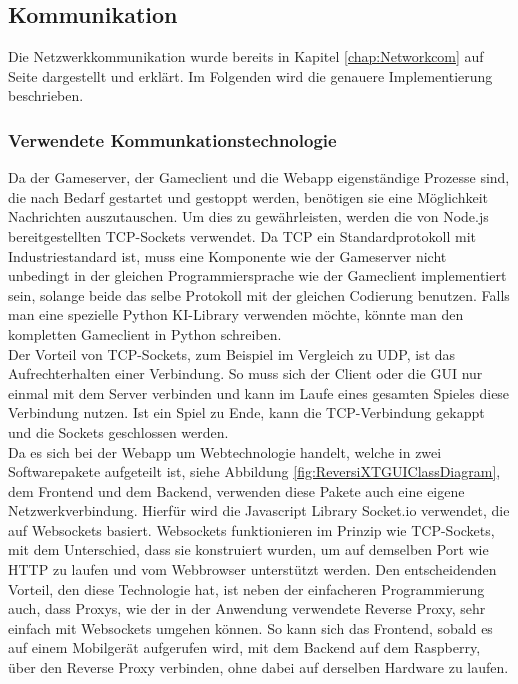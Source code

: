 \documentclass[12pt,a4paper,bibliography=totocnumbered,listof=totocnumbered]{article}
\begin{document}
\subsection{Kommunikation}
Die Netzwerkkommunikation wurde bereits in Kapitel \ref{chap:Networkcom} auf Seite \pageref{chap:Networkcom} dargestellt und erklärt.
Im Folgenden wird die genauere Implementierung beschrieben.

\subsubsection{Verwendete Kommunkationstechnologie}
Da der Gameserver, der Gameclient und die Webapp eigenständige Prozesse sind, die nach Bedarf gestartet und gestoppt werden, benötigen sie eine 
Möglichkeit Nachrichten auszutauschen. Um dies zu gewährleisten, werden die von Node.js bereitgestellten \ac{TCP}-Sockets verwendet. 
Da \ac{TCP} ein Standardprotokoll mit Industriestandard ist, muss eine Komponente wie der Gameserver nicht unbedingt in der gleichen Programmiersprache 
wie der Gameclient implementiert sein, solange beide das selbe Protokoll mit der gleichen Codierung benutzen.
Falls man eine spezielle Python KI-Library verwenden möchte, könnte man den kompletten Gameclient in Python schreiben.
\\
Der Vorteil von \ac{TCP}-Sockets, zum Beispiel im Vergleich zu \ac{UDP}, ist das Aufrechterhalten einer Verbindung. So muss sich der Client oder die \ac{GUI} nur einmal mit dem Server verbinden 
und kann im Laufe eines gesamten Spieles diese Verbindung nutzen. Ist ein Spiel zu Ende, kann die \ac{TCP}-Verbindung gekappt und die 
Sockets geschlossen werden. 
\\
Da es sich bei der Webapp um Webtechnologie handelt, welche in zwei Softwarepakete aufgeteilt ist, siehe Abbildung \ref{fig:ReversiXTGUIClassDiagram}, dem Frontend und dem Backend, verwenden 
diese Pakete auch eine eigene Netzwerkverbindung. Hierfür wird die Javascript Library Socket.io verwendet, die auf Websockets basiert.
Websockets funktionieren im Prinzip wie \ac{TCP}-Sockets, mit dem Unterschied, dass sie konstruiert wurden, um auf demselben Port wie HTTP zu laufen und vom 
Webbrowser unterstützt werden. Den entscheidenden Vorteil, den diese Technologie hat, ist neben der einfacheren Programmierung auch, dass Proxys, 
wie der in der Anwendung verwendete Reverse Proxy, sehr einfach mit Websockets umgehen können. So kann sich das Frontend, sobald es auf einem 
Mobilgerät aufgerufen wird, mit dem Backend auf dem Raspberry, über den Reverse Proxy verbinden, ohne dabei auf derselben Hardware zu laufen.
\end{document}
